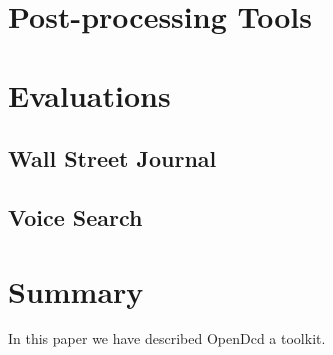 \documentclass{article}
\begin{document}
\section{Post-processing Tools}
\label{sec:postprocess}

\section{Evaluations}
\label{sec:majhead}

\subsection{Wall Street Journal}

\subsection{Voice Search}

\section{Summary}
\label{sec:page}
In this paper we have described OpenDcd a toolkit.



\end{document}
